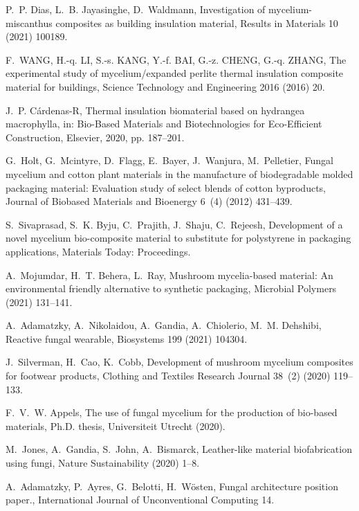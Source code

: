 \documentclass[]{elsarticle}
\begin{document}
\begin{thebibliography}{10}
P.~P. Dias, L.~B. Jayasinghe, D.~Waldmann, Investigation of mycelium-miscanthus
  composites as building insulation material, Results in Materials 10 (2021)
  100189.

F.~WANG, H.-q. LI, S.-s. KANG, Y.-f. BAI, G.-z. CHENG, G.-q. ZHANG, The
  experimental study of mycelium/expanded perlite thermal insulation composite
  material for buildings, Science Technology and Engineering 2016 (2016) 20.

J.~P. C{\'a}rdenas-R, Thermal insulation biomaterial based on hydrangea
  macrophylla, in: Bio-Based Materials and Biotechnologies for Eco-Efficient
  Construction, Elsevier, 2020, pp. 187--201.

G.~Holt, G.~Mcintyre, D.~Flagg, E.~Bayer, J.~Wanjura, M.~Pelletier, Fungal
  mycelium and cotton plant materials in the manufacture of biodegradable
  molded packaging material: Evaluation study of select blends of cotton
  byproducts, Journal of Biobased Materials and Bioenergy 6~(4) (2012)
  431--439.

S.~Sivaprasad, S.~K. Byju, C.~Prajith, J.~Shaju, C.~Rejeesh, Development of a
  novel mycelium bio-composite material to substitute for polystyrene in
  packaging applications, Materials Today: Proceedings.

A.~Mojumdar, H.~T. Behera, L.~Ray, Mushroom mycelia-based material: An
  environmental friendly alternative to synthetic packaging, Microbial Polymers
  (2021) 131--141.

A.~Adamatzky, A.~Nikolaidou, A.~Gandia, A.~Chiolerio, M.~M. Dehshibi, Reactive
  fungal wearable, Biosystems 199 (2021) 104304.

J.~Silverman, H.~Cao, K.~Cobb, Development of mushroom mycelium composites for
  footwear products, Clothing and Textiles Research Journal 38~(2) (2020)
  119--133.

F.~V.~W. Appels, The use of fungal mycelium for the production of bio-based
  materials, Ph.D. thesis, Universiteit Utrecht (2020).

M.~Jones, A.~Gandia, S.~John, A.~Bismarck, Leather-like material biofabrication
  using fungi, Nature Sustainability (2020) 1--8.

A.~Adamatzky, P.~Ayres, G.~Belotti, H.~W{\"o}sten, Fungal architecture position
  paper., International Journal of Unconventional Computing 14.


\end{thebibliography}
\end{document}

